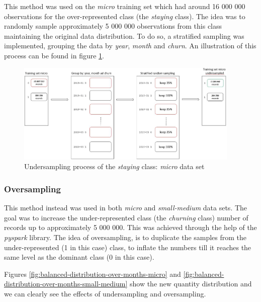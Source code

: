 \documentclass[LaM,binding=0.6cm, english]{sapthesis}
\begin{document}
This method was used on the \textit{micro} training set which had around 16 000 000 observations for the over-represented class (the \textit{staying} class). The idea was to randomly sample approximately 5 000 000 observations from this class maintaining the original data distribution. To do so, a stratified sampling was implemented, grouping the data by \textit{year}, \textit{month} and \textit{churn}. An illustration of this process can be found in figure \ref{fig:undersampling-staying-class-micro}.

\begin{figure}[!ht]
    \includegraphics[width=0.95\textwidth]{images/undersampling-staying-class-micro.jpg}
    \centering
    \caption{Undersampling process of the \textit{staying} class: \textit{micro} data set}
    \label{fig:undersampling-staying-class-micro}
\end{figure}

\subsubsection{Oversampling}

This method instead was used in both \textit{micro} and \textit{small-medium} data sets. The goal was to increase the under-represented class (the \textit{churning} class) number of records up to approximately 5 000 000. This was achieved through the help of the \textit{pyspark} library. The idea of oversampling, is to duplicate the samples from the under-represented (1 in this case) class, to inflate the numbers till it reaches the same level as the dominant class (0 in this case).

Figures \ref{fig:balanced-distribution-over-months-micro} and \ref{fig:balanced-distribution-over-months-small-medium} show the new quantity distribution and we can clearly see the effects of undersampling and oversampling.
\end{document}
